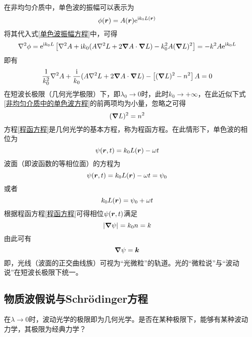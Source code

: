 在非均匀介质中，单色波的振幅可以表示为
\begin{equation*}
	\phi(\boldsymbol{r}) = A(\boldsymbol{r}) \mathrm{e}^{\mathrm{i}k_0 L(\boldsymbol{r})}
\end{equation*}
将其代入式\eqref{单色波振幅方程}中，可得
\begin{equation*}
	\nabla^2 \phi = \mathrm{e}^{\mathrm{i}k_0 L} \left[\nabla^2 A + \mathrm{i} k_0(A\nabla^2 L + 2\boldsymbol{\nabla} A \cdot \boldsymbol{\nabla} L) - k_0^2 A(\boldsymbol{\nabla} L)^2 \right] = -k^2 A \mathrm{e}^{\mathrm{i} k_0 L}
\end{equation*}
即有
\begin{equation}
	\frac{1}{k_0^2} \nabla^2 A + \frac{\mathrm{i}}{k_0} (A\nabla^2 L + 2\boldsymbol{\nabla} A \cdot \boldsymbol{\nabla} L) - \left[(\boldsymbol{\nabla} L)^2 - n^2\right] A = 0
	\label{非均匀介质中的单色波方程}
\end{equation}
在短波长极限（几何光学极限）下，即$\lambda_0 \to 0$时，此时$k_0 \to +\infty$，在此近似下式\eqref{非均匀介质中的单色波方程}的前两项均为小量，忽略之可得
\begin{equation}
	(\boldsymbol{\nabla} L)^2 = n^2
	\label{程函方程}
\end{equation}
方程\eqref{程函方程}是几何光学的基本方程，称为{\heiti 程函方程}。在此情形下，单色波的相位为
\begin{equation*}
	\psi(\boldsymbol{r},t) = k_0 L(\boldsymbol{r}) - \omega t
\end{equation*}
波面（即波函数的等相位面）的方程为
\begin{equation*}
	\psi(\boldsymbol{r},t) = k_0 L(\boldsymbol{r}) - \omega t = \psi_0
\end{equation*}
或者
\begin{equation*}
	k_0 L(\boldsymbol{r}) = \psi_0 + \omega t
\end{equation*}
根据程函方程\eqref{程函方程}可得相位$\psi(\boldsymbol{r},t)$满足
\begin{equation*}
	|\boldsymbol{\nabla} \psi| = k_0 n = k
\end{equation*}
由此可有
\begin{equation*}
	\boldsymbol{\nabla} \psi = \boldsymbol{k}
\end{equation*}
即，光线（波面的正交曲线族）可视为“光微粒”的轨道。光的“微粒说”与“波动说”在短波长极限下统一。

\subsection{物质波假说与Schr\"{o}dinger方程}

在$\lambda \to 0$时，波动光学的极限即为几何光学。是否在某种极限下，能够有某种波动力学，其极限为经典力学？

